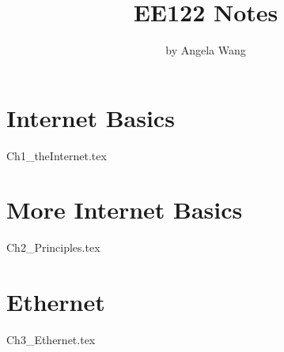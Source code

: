 \documentclass{book}
\title{\textbf{EE122 Notes}}
\author{by Angela Wang}
\date{}
\begin{document}
\maketitle
\tableofcontents
\mainmatter

\chapter{Internet Basics}
{Ch1_theInternet.tex}

\chapter{More Internet Basics}
{Ch2_Principles.tex}

\chapter{Ethernet}
{Ch3_Ethernet.tex}
\end{document}
